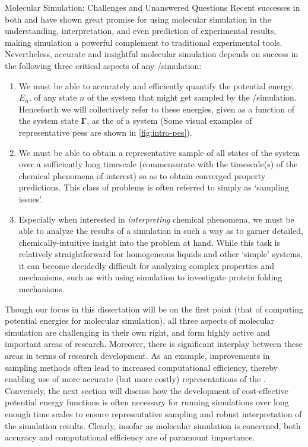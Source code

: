 \begin{section}{Molecular Simulation: Challenges and Unanswered Questions}
Recent successes in both \mc and \md 
have shown great promise for using molecular simulation in the understanding,
interpretation, and even prediction of experimental
results,\cite{VanGunsteren1990}
making simulation a powerful complement to traditional experimental tools.
\cite{Hospital2015,Karplus2002,Bereau2016,Chen2015,Maurin2016,Jiang2011,Schneider2005,Jorgensen2004}
Nevertheless, accurate and insightful molecular simulation
depends on success in the following three critical aspects of any \md/\mc simulation:
\cite{Lane2013}
%
\begin{enumerate}
\item We must be able to accurately and efficiently quantify the potential
energy, $E_n$, of any state $n$ of the system that might get sampled by the
\md/\mc simulation. 
\cite{Ballone2014,Lopes2015,Saunders2013,DeCarvalho2014}
Henceforth we will collectively refer to these energies, given as a function
of the system state $\bm \Gamma$, as the \pes of a system (Some visual
examples of representative \glspl{pes} are shown in \cref{fig:intro-pes}).
\item We must be able to obtain a representative sample of all states of the system over a sufficiently long timescale
(commensurate with the timescale(s) of the chemical phenomena of interest) so as
to obtain converged property predictions.
\cite{Lei2007,Grossfield2010,Theodorou2010}
This class of problems is often referred to simply as `sampling issues'.
\item Especially when interested in \emph{interpreting} chemical phenomena, we must be
able to analyze the results of a simulation in such a way as to garner
detailed, chemically-intuitive insight into the problem at hand.
\cite{E2010,Pande2010,Rohrdanz2013}
While this task is relatively straightforward for homogeneous liquids and
other `simple' systems,
it can become decidedly
difficult for analyzing complex properties and mechanisms, such as with using
simulation to investigate protein folding mechanisms.
\end{enumerate}
Though our focus in this dissertation will be on the first point (that of
computing potential energies for molecular simulation), all three 
aspects of molecular simulation are challenging in their own right, and form
highly active and important areas of research. 
\cite{Ciccotti2014} 
Moreover, there is significant interplay between these areas in terms of
research development.
As an example, improvements in sampling methods often lead to increased computational
efficiency, thereby enabling use of more accurate (but more costly)
representations of the \pes. Conversely, the next section will discuss how the development of
cost-effective potential energy functions is often necessary for
running simulations over long enough time scales to ensure representative
sampling and robust interpretation of the simulation results. Clearly, insofar
as molecular simulation is concerned, both
accuracy and computational efficiency are of paramount importance. 


\end{section}
